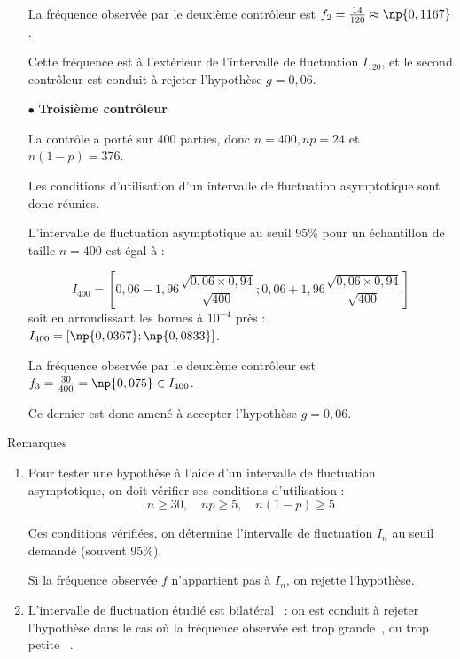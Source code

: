 \documentclass[12pt,french]{article}
\begin{document}
\begin{spacing}{1.2}
\begin{itemize}
La fréquence observée par le deuxième contrôleur est $f_2=\frac{14}{120}\approx \np{0,1167}$.

Cette fréquence est à l'extérieur de l'intervalle de fluctuation $I_{120}$, et le second contrôleur est conduit à rejeter l'hypothèse $g=0,06$.

\item[$\bullet$] \textbf{Troisième contrôleur}

La contrôle a porté sur 400 parties, donc $n=400, np=24$ et $n(1-p)=376$.

Les conditions d'utilisation d'un intervalle de fluctuation asymptotique sont donc réunies.

L'intervalle de fluctuation asymptotique au seuil 95\% pour un échantillon de taille $n=400$ est égal à :

\[I_{400}=\left[0,06-1,96\frac{\sqrt{0,06\times 0,94}}{\sqrt{400}};0,06+1,96\frac{\sqrt{0,06\times 0,94}}{\sqrt{400}}\right]\]
soit en arrondissant les bornes à $10^{-4}$ près : $I_{400}=[\np{0,0367};\np{0,0833}]$.

La fréquence observée par le deuxième contrôleur est $f_3=\frac{30}{400}= \np{0,075}\in I_{400}$.

Ce dernier est donc amené à accepter l'hypothèse $g=0,06$.

\end{itemize}

\medskip

\begin{bclogo}[couleur = gray!30 , arrondi = 0.1 ,logo = \bclampe , barre = snake , tailleOndu = 1.5]{Remarques}

\begin{enumerate}
\item Pour tester une hypothèse à l'aide d'un intervalle de fluctuation asymptotique, on doit vérifier ses conditions d'utilisation :
\[n\geq 30, \quad np\geq 5, \quad n(1-p)\geq 5\]

Ces conditions vérifiées, on détermine l'intervalle de fluctuation $I_n$ au seuil demandé (souvent 95\%).

Si la fréquence observée $f$ n'appartient pas à $I_n$, on rejette l'hypothèse.

\item L'intervalle de fluctuation étudié est \og bilatéral\fg~ : on est conduit à rejeter l'hypothèse dans le cas où la fréquence observée est \og trop grande\fg~, ou \og trop petite \fg~.
\end{enumerate}
\end{bclogo}




\end{spacing}

\end{document}
